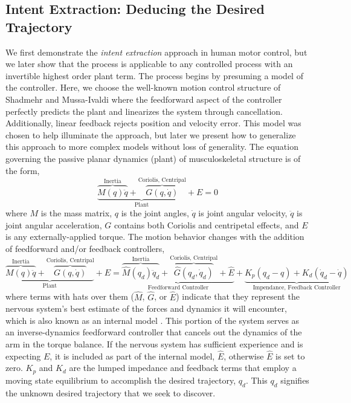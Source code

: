 \subsection*{Intent Extraction: Deducing the Desired Trajectory}
We first demonstrate the \textit{intent extraction} approach in human motor control, but we later show that the process is applicable to any controlled process with an invertible highest order plant term. The process begins by presuming a model of the controller. Here, we choose the well-known motion control structure of Shadmehr and Mussa-Ivaldi\cite{shadmehr1994adaptive} where the feedforward aspect of the controller perfectly predicts the plant and linearizes the system through cancellation. Additionally, linear feedback rejects position and velocity error. This model was chosen to help illuminate the approach, but later we present how to generalize this approach to more complex models without loss of generality. The equation governing the passive planar dynamics (plant) of musculoskeletal structure is of the form,
\begin{equation}
\underbrace{\overbrace{M(q)\ddot{q}}^{\text{Inertia}}+\overbrace{G(q,\dot{q})}^{\text{Coriolis, Centripal}}}_{\text{Plant}}+E=0
\end{equation}
where $M$ is the mass matrix, $q$ is the joint angles, $\dot{q}$ is joint angular velocity, $\ddot{q}$ is joint angular acceleration, $G$ contains both Coriolis and centripetal effects, and $E$ is any externally-applied torque. The motion behavior changes with the addition of feedforward and/or feedback controllers,
\begin{equation}
\underbrace{\overbrace{M(q)\ddot{q}}^{\text{Inertia}}+\overbrace{G(q,\dot{q})}^{\text{Coriolis, Centripal}}}_{\text{Plant}}+E=\underbrace{\overbrace{\hat{M}(q_d)\ddot{q}_d}^{\text{Inertia}}+\overbrace{\hat{G}(q_d,\dot{q}_d)}^{\text{Coriolis, Centripal}}+\hat{E}}_{\text{Feedforward Controller}}+\underbrace{K_p(q_d-q)+K_d(\dot{q}_d-\dot{q})}_{\text{Impendance, Feedback Controller}}
\end{equation}
where terms with hats over them ($\hat{M}$, $\hat{G}$, or $\hat{E}$) indicate that they represent the nervous system's best estimate of the forces and dynamics it will encounter, which is also known as an internal model \cite{shadmehr1994adaptive}. This portion of the system serves as an inverse-dynamics feedforward controller that cancels out the dynamics of the arm in the torque balance. If the nervous system has sufficient experience and is expecting $E$, it is included as part of the internal model, $\hat{E}$, otherwise $\hat{E}$ is set to zero. $K_p$ and $K_d$ are the lumped impedance and feedback terms that employ a moving state equilibrium to accomplish the desired trajectory, $q_d$. This $q_d$ signifies the unknown desired trajectory that we seek to discover.

